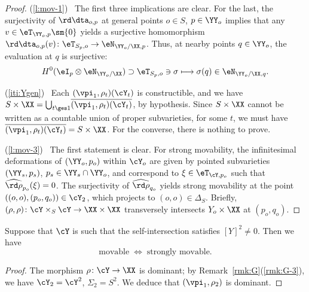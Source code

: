 \begin{proof}
 (\ref{l:mov-1})~  The first three implications are clear. For the last, the surjectivity of $\rd\dta_{o,p}$ at general points $o\in S$, $p\in\YY_o$ implies that any $v\in\eT_{\YY_o,p}\sm\{0\}$ yields a surjective homomorphism $\rd\dta_{o,p}(v)\colon \eT_{S_p,o}\to\eN_{\YY_o/\XX,p}$. Thus, at nearby points $q\in\YY_o$, the evaluation at $q$ is surjective:  
  \[
  H^0(\eI_p\otimes\eN_{\YY_o/\XX})\supset\eT_{S_p,o}\ni\sigma\longmapsto\sigma(q)\in\eN_{\YY_o/\XX,q}.
  \]
  
(\ref{iti:Ygen})~ Each $(\vpi_1,\rho_t)(\cY_t)$ is constructible, and we have 
$S\times\XX={\bigcup}_{t\ges 1} \overline{(\vpi_1,\rho_t)(\cY_t)}$, by hypothesis.  Since $S\times\XX$ cannot be written as a countable union of proper subvarieties, for some $t$, we must have $\overline{(\vpi_1,\rho_t)(\cY_t)}=S\times\XX$. For the converse, there is nothing to prove.

(\ref{l:mov-3})~  The first statement is clear. For strong movability, the infinitesimal deformations of $(\YY_o,p_o)$ within $\cY_o$ are given by pointed subvarieties $(\YY_s,p_s)$, $p_s\in\YY_s\cap\YY_o$, and correspond to $\xi\in\eT_{\cY, p_o}$ such that $\widehat{\rd\rho}_{p_o}(\xi)=0$. The surjectivity of $\widehat{\rd\rho}_{q_o}$ yields  strong movability at the point $((o,o),(p_o,q_o))\in\cY_2$, which projects to $(o,o)\in\Delta_S$. Briefly, $(\rho,\rho)\colon \cY\times_S\cY\to\XX\times\XX$ transversely intersects  $Y_o\times\XX$ at $(p_o,q_o)$. 
\end{proof}

\begin{m-lemma}\label{lm:conn-mov}
Suppose that $\cY$ is such that the self-intersection satisfies $[Y]^2\neq0$. Then we have 
\[
\text{movable}\;\;\Longleftrightarrow\;\;\text{strongly movable.}
\] 
\end{m-lemma}

\begin{proof}
The morphism $\rho\colon \cY\to\XX$ is dominant; by Remark~\ref{rmk:G}(\ref{rmk:G-3}), we have $\cY_2=\cY^2$, $\Sigma_2=S^2$. We deduce that $(\vpi_1,\rho_2)$ is dominant.
\end{proof}

